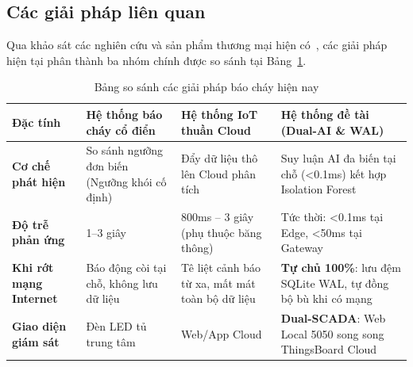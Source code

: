 \subsection{Các giải pháp liên quan}
Qua khảo sát các nghiên cứu và sản phẩm thương mại hiện có~\cite{smart_fire_alarm_iot_2021}, các giải pháp hiện tại phân thành ba nhóm chính được so sánh tại Bảng~\ref{tab:so_sanh_giai_phap}.

\begin{table}[H]
\centering
\caption{Bảng so sánh các giải pháp báo cháy hiện nay}
\label{tab:so_sanh_giai_phap}
\small
\begin{tabular}{|p{3.2cm}|p{3.8cm}|p{4.2cm}|p{3.8cm}|}
\hline
\textbf{Đặc tính} & \textbf{Hệ thống báo cháy cổ điển} & \textbf{Hệ thống IoT thuần Cloud} & \textbf{Hệ thống đề tài (Dual-AI \& WAL)} \\ \hline
\textbf{Cơ chế phát hiện} & So sánh ngưỡng đơn biến (Ngưỡng khói cố định) & Đẩy dữ liệu thô lên Cloud phân tích & Suy luận AI đa biến tại chỗ (<0.1ms) kết hợp Isolation Forest \\ \hline
\textbf{Độ trễ phản ứng} & 1--3 giây & 800ms -- 3 giây (phụ thuộc băng thông) & Tức thời: <0.1ms tại Edge, <50ms tại Gateway \\ \hline
\textbf{Khi rớt mạng Internet} & Báo động còi tại chỗ, không lưu dữ liệu & Tê liệt cảnh báo từ xa, mất mát toàn bộ dữ liệu & \textbf{Tự chủ 100\%}: lưu đệm SQLite WAL, tự đồng bộ bù khi có mạng \\ \hline
\textbf{Giao diện giám sát} & Đèn LED tủ trung tâm & Web/App Cloud & \textbf{Dual-SCADA}: Web Local 5050 song song ThingsBoard Cloud \\ \hline
\end{tabular}
\end{table}

